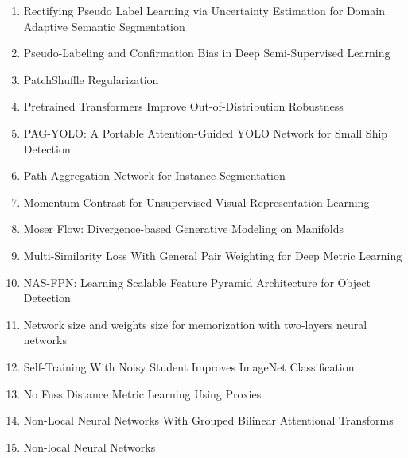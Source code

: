 \documentclass[acmlarge]{acmart}
\begin{document}
\begin{enumerate}
	\item Rectifying Pseudo Label Learning via Uncertainty Estimation for Domain Adaptive Semantic Segmentation \cite{Zheng2021RectifyingPL} 

	\item Pseudo-Labeling and Confirmation Bias in Deep Semi-Supervised Learning \cite{Arazo2020PseudoLabelingAC} 

	\item PatchShuffle Regularization \cite{Kang2017PatchShuffleR} 

	\item Pretrained Transformers Improve Out-of-Distribution Robustness \cite{Hendrycks2020PretrainedTI} 

	\item PAG-YOLO: A Portable Attention-Guided YOLO Network for Small Ship Detection \cite{Hu2021PAGYOLOAP} 

	\item Path Aggregation Network for Instance Segmentation \cite{Liu2018PathAN} 

	\item Momentum Contrast for Unsupervised Visual Representation Learning \cite{He2020MomentumCF} 

	\item Moser Flow: Divergence-based Generative Modeling on Manifolds \cite{Rozen2021MoserFD} 

	\item Multi-Similarity Loss With General Pair Weighting for Deep Metric Learning \cite{Wang2019MultiSimilarityLW} 

	\item NAS-FPN: Learning Scalable Feature Pyramid Architecture for Object Detection \cite{Ghiasi2019NASFPNLS} 

	\item Network size and weights size for memorization with two-layers neural networks \cite{Bubeck2020NetworkSA} 

	\item Self-Training With Noisy Student Improves ImageNet Classification \cite{Xie2020SelfTrainingWN} 

	\item No Fuss Distance Metric Learning Using Proxies \cite{MovshovitzAttias2017NoFD} 

	\item Non-Local Neural Networks With Grouped Bilinear Attentional Transforms \cite{Chi2020NonLocalNN} 

	\item Non-local Neural Networks \cite{Wang2018NonlocalNN} 


\end{enumerate}
\end{document}
